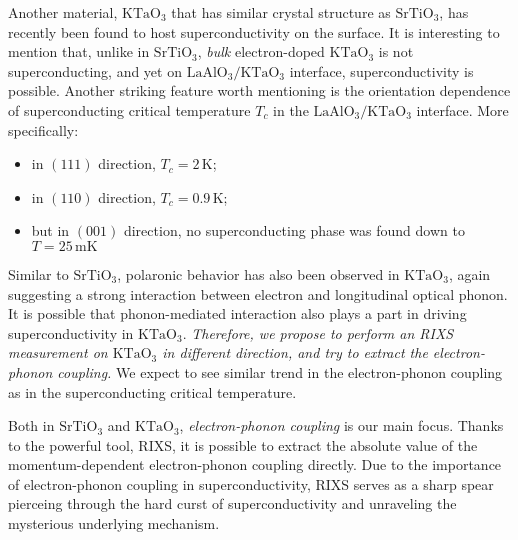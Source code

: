 \documentclass[11pt]{article}
\begin{document}
Another material, $\mathrm{KTaO_{3}}$ that has similar crystal structure as $\mathrm{SrTiO_{3}}$, has recently been found to host superconductivity on the surface\cite{ren_two-dimensional_2022}. It is interesting to mention that, unlike in $\mathrm{SrTiO_{3}}$, \textit{bulk}  electron-doped $\mathrm{KTaO_{3}}$ is not superconducting, and yet on $\mathrm{LaAlO_{3}/KTaO_{3}}$ interface, superconductivity is possible\cite{ren_two-dimensional_2022,chen_two-dimensional_2021}. Another striking feature worth mentioning is the orientation dependence of superconducting critical temperature $T_{c}$ in the $\mathrm{LaAlO_{3}/KTaO_{3}}$ interface\cite{ren_two-dimensional_2022,chen_two-dimensional_2021}. More specifically: 
\begin{itemize}
\item in $(111)$ direction, $T_{c} = 2\,\mathrm{K}$\cite{ren_two-dimensional_2022};
\item in $(110)$ direction, $T_{c} = 0.9\,\mathrm{K}$\cite{chen_two-dimensional_2021};
\item but in $(001)$ direction, no superconducting phase was found down to $T = 25\,\mathrm{mK}$\cite{ren_two-dimensional_2022} 
\end{itemize}
Similar to $\mathrm{SrTiO_{3}}$\cite{swartz_polaronic_2018}, polaronic behavior has also been observed in $\mathrm{KTaO_{3}}$, again suggesting a strong interaction between electron and longitudinal optical phonon\cite{chen_orientation-dependent_2023}. It is possible that phonon-mediated interaction also plays a part in driving superconductivity in $\mathrm{KTaO_{3}}$. \textit{Therefore, we propose to perform an RIXS measurement on $\mathrm{KTaO_{3}}$ in different direction, and try to extract the electron-phonon coupling.}  We expect to see similar trend in the electron-phonon coupling as in the superconducting critical temperature. 

Both in $\mathrm{SrTiO_{3}}$ and $\mathrm{KTaO_{3}}$, \textit{electron-phonon coupling}  is our main focus. Thanks to the powerful tool, RIXS, it is possible to extract the absolute value of the momentum-dependent electron-phonon coupling directly. Due to the importance of electron-phonon coupling in superconductivity, RIXS serves as a sharp spear pierceing through the hard curst of superconductivity and unraveling the mysterious underlying mechanism. 
\end{document}

